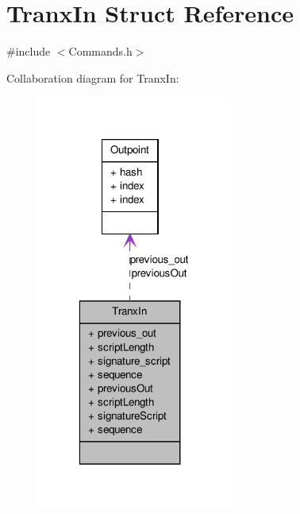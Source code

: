 \hypertarget{struct_tranx_in}{
\section{TranxIn Struct Reference}
\label{struct_tranx_in}
}


{\ttfamily \#include $<$Commands.h$>$}



Collaboration diagram for TranxIn:\nopagebreak
\begin{figure}[H]
\begin{center}
\leavevmode
\includegraphics[width=183pt]{struct_tranx_in__coll__graph}
\end{center}
\end{figure}

